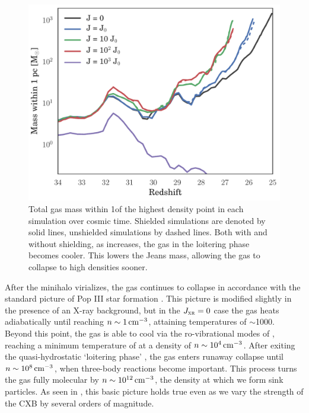 \documentclass[../thesis.tex]{subfiles}
\begin{document}
\begin{figure}
  \begin{center}
    \includegraphics[width=\columnwidth]{figures/growth/collapse}
    \caption{Total gas mass within 1\pc of the highest density point in each simulation over cosmic time. Shielded simulations are denoted by solid lines, unshielded simulations by dashed lines.  Both with and without shielding, as \jxr increases, the gas in the loitering phase becomes cooler. This lowers the Jeans mass, allowing the gas to collapse to high densities sooner.}
    \label{xrfig:collapse}
  \end{center}
\end{figure}

After the minihalo virializes, the gas continues to collapse in accordance with the standard picture of Pop III star formation \citep[e.g.,][]{StacyGreifBromm2010, Greifetal2012, StacyBromm2013}. This picture is modified slightly in the presence of an X-ray background, but in the $J_{\textsc{xr}}=0$ case the gas heats adiabatically until reaching $n\sim1\,\mathrm{cm}^{-3}$, attaining temperatures of $\sim$1000\kelvin. Beyond this point, the gas is able to cool via the ro-vibrational modes of \htwo, reaching a minimum temperature of \kelvin at a density of $n\sim10^4\,\mathrm{cm}^{-3}$.  After exiting the quasi-hydrostatic `loitering phase' \citep{BrommCoppiLarson2002}, the gas enters runaway collapse until $n\sim10^8\,\mathrm{cm}^{-3}$, when three-body reactions become important.  This process turns the gas fully molecular by $n\sim10^{12}\,\mathrm{cm}^{-3}$, the density at which we form sink particles. As seen in , this basic picture holds true even as we vary the strength of the CXB by several orders of magnitude. 
\end{document}

